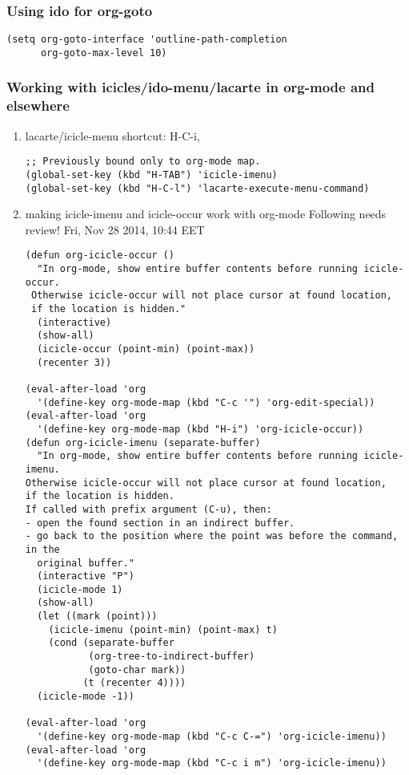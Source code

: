 \documentclass[nofonts]{tufte-handout}
\begin{document}
\subsubsection{Using ido for org-goto}
\label{sec-2-5-2}

\begin{verbatim}
(setq org-goto-interface 'outline-path-completion
      org-goto-max-level 10)
\end{verbatim}

\subsubsection{Working with icicles/ido-menu/lacarte in org-mode and elsewhere}
\label{sec-2-5-3}
\begin{enumerate}
\item lacarte/icicle-menu shortcut: H-C-i,
\label{sec-2-5-3-1}
\begin{verbatim}
;; Previously bound only to org-mode map.
(global-set-key (kbd "H-TAB") 'icicle-imenu)
(global-set-key (kbd "H-C-l") 'lacarte-execute-menu-command)
\end{verbatim}
\item making icicle-imenu and icicle-occur work with org-mode
\label{sec-2-5-3-2}
Following needs review! Fri, Nov 28 2014, 10:44 EET
\begin{verbatim}
(defun org-icicle-occur ()
  "In org-mode, show entire buffer contents before running icicle-occur.
 Otherwise icicle-occur will not place cursor at found location,
 if the location is hidden."
  (interactive)
  (show-all)
  (icicle-occur (point-min) (point-max))
  (recenter 3))

(eval-after-load 'org
  '(define-key org-mode-map (kbd "C-c '") 'org-edit-special))
(eval-after-load 'org
  '(define-key org-mode-map (kbd "H-i") 'org-icicle-occur))
(defun org-icicle-imenu (separate-buffer)
  "In org-mode, show entire buffer contents before running icicle-imenu.
Otherwise icicle-occur will not place cursor at found location,
if the location is hidden.
If called with prefix argument (C-u), then:
- open the found section in an indirect buffer.
- go back to the position where the point was before the command, in the
  original buffer."
  (interactive "P")
  (icicle-mode 1)
  (show-all)
  (let ((mark (point)))
    (icicle-imenu (point-min) (point-max) t)
    (cond (separate-buffer
           (org-tree-to-indirect-buffer)
           (goto-char mark))
          (t (recenter 4))))
  (icicle-mode -1))

(eval-after-load 'org
  '(define-key org-mode-map (kbd "C-c C-=") 'org-icicle-imenu))
(eval-after-load 'org
  '(define-key org-mode-map (kbd "C-c i m") 'org-icicle-imenu))


\end{verbatim}
\end{enumerate}
\end{document}
